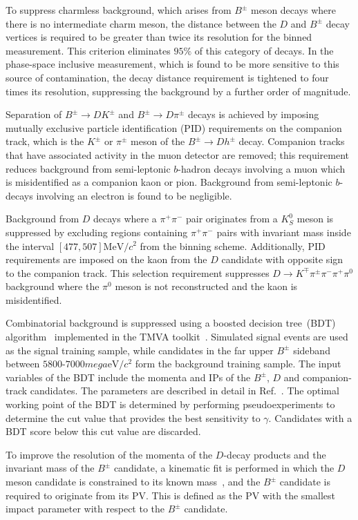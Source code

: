 \documentclass[12pt, a4paper, notitlepage, onecolumn]{article}
\begin{document}
To suppress charmless background, which arises from $B^\pm$ meson decays where there is no intermediate charm meson, the distance between the $D$ and $B^\pm$ decay vertices is required to be greater than twice its resolution for the binned measurement. This criterion eliminates $95\%$ of this category of decays. In the phase-space inclusive measurement, which is found to be more sensitive to this source of contamination, the decay distance requirement is tightened to four times its resolution, suppressing the background by a further order of magnitude.

Separation of $B^\pm\to DK^\pm$ and $B^\pm\to D\pi^\pm$ decays is achieved by imposing mutually exclusive particle identification (PID) requirements on the companion track, which is the $K^\pm$ or $\pi^\pm$ meson of the $B^\pm\to Dh^\pm$ decay. Companion tracks that have associated activity in the muon detector are removed; this requirement reduces background from semi-leptonic $b$-hadron decays involving a muon which is misidentified as a companion kaon or pion. Background from semi-leptonic $b$-decays involving an electron is found to be negligible.  

Background from $D$ decays where a $\pi^+\pi^-$ pair originates from a $K^0_S$ meson is suppressed by excluding regions containing $\pi^+\pi^-$ pairs with invariant mass inside the interval $[477, 507]\si{\mega\eV/c^2}$ from the binning scheme. Additionally, PID requirements are imposed on the kaon from the $D$ candidate with opposite sign to the companion track. This selection requirement suppresses $D\to K^\mp\pi^\pm\pi^-\pi^+\pi^0$ background where the $\pi^0$ meson is not reconstructed and the kaon is misidentified. 

Combinatorial background is suppressed using a boosted decision tree~(BDT) algorithm~\cite{Breiman,AdaBoost} implemented in the TMVA toolkit~\cite{Hocker:2007ht,*TMVA4}. Simulated signal events are used as the signal training sample, while candidates in the far upper $B^\pm$ sideband between $5800$-$7000\si{mega\eV/c^2}$ form the background training sample. The input variables of the BDT include the momenta and IPs of the $B^\pm$, $D$ and companion-track candidates. The parameters are described in detail in Ref.~\cite{LHCb-PAPER-2018-017}. The optimal working point of the BDT is determined by performing pseudoexperiments to determine the cut value that provides the best sensitivity to $\gamma$. Candidates with a BDT score below this cut value are discarded.

To improve the resolution of the momenta of the $D$-decay products and the invariant mass of the $B^\pm$ candidate, a kinematic fit is performed in which the $D$ meson candidate is constrained to its known mass~\cite{PDG2022}, and the $B^\pm$ candidate is required to originate from its PV. This is defined as the PV with the smallest impact parameter with respect to the $B^\pm$ candidate.
\end{document}
